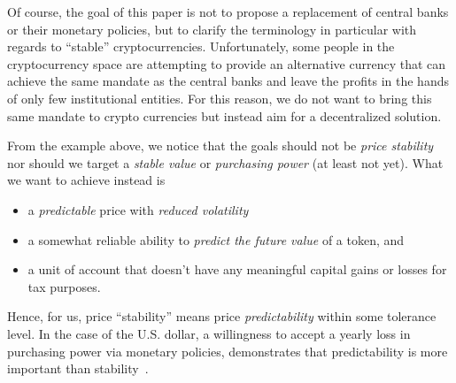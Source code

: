 Of course, the goal of this paper is not to propose a replacement of central
banks or their monetary policies, but to clarify the terminology in particular
with regards to ``stable'' cryptocurrencies. Unfortunately, some people in the
cryptocurrency space are attempting to provide an alternative currency that can
achieve the same mandate as the central banks and leave the profits in the
hands of only few institutional entities. For this reason, we do not want to
bring this same mandate to crypto currencies but instead aim for a
decentralized solution.

From the example above, we notice that the goals should not be \emph{price
stability} nor should we target a \emph{stable value} or \emph{purchasing
power} (at least not yet). 
%
What we want to achieve instead is 
\begin{itemize}
 \item a \emph{predictable} price with \emph{reduced volatility}
 \item a somewhat reliable ability to \emph{predict the future value} of a token, and
 \item a unit of account that doesn't have any meaningful capital gains or
       losses for tax purposes.
\end{itemize}

Hence, for us, price ``stability'' means price \emph{predictability} within
some tolerance level. In the case of the U.S. dollar, a willingness to accept a
yearly loss in purchasing power via monetary policies, demonstrates that
predictability is more important than stability~\cite{bm:stable:impossible}.



%
%
%
